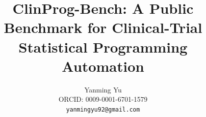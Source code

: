 \documentclass{article}
\title{ClinProg-Bench: A Public Benchmark for Clinical-Trial Statistical Programming Automation}
\author{%
  Yanming Yu \\
  ORCID: 0009-0001-6701-1579 \\
  \texttt{yanmingyu92@gmail.com}
}
\begin{document}
\maketitle

\begin{abstract}

\end{abstract}












\appendix


\end{document}

